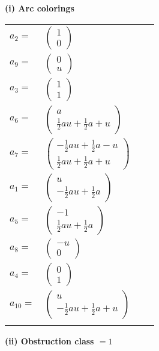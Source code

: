 \documentclass[1p]{elsarticle_modified}
\theoremstyle{definition}
\begin{document}
\flushleft \textbf{(i) Arc colorings}\\
\begin{tabular}{m{7pt} m{180pt} m{7pt} m{180pt} }
\flushright $a_{2}=$&$\begin{pmatrix}1\\0\end{pmatrix}$ \\
\flushright $a_{9}=$&$\begin{pmatrix}0\\u\end{pmatrix}$ \\
\flushright $a_{3}=$&$\begin{pmatrix}1\\1\end{pmatrix}$ \\
\flushright $a_{6}=$&$\begin{pmatrix}a\\\frac{1}{2} a u+\frac{1}{2} a+u\end{pmatrix}$ \\
\flushright $a_{7}=$&$\begin{pmatrix}-\frac{1}{2} a u+\frac{1}{2} a- u\\\frac{1}{2} a u+\frac{1}{2} a+u\end{pmatrix}$ \\
\flushright $a_{1}=$&$\begin{pmatrix}u\\-\frac{1}{2} a u+\frac{1}{2} a\end{pmatrix}$ \\
\flushright $a_{5}=$&$\begin{pmatrix}-1\\\frac{1}{2} a u+\frac{1}{2} a\end{pmatrix}$ \\
\flushright $a_{8}=$&$\begin{pmatrix}- u\\0\end{pmatrix}$ \\
\flushright $a_{4}=$&$\begin{pmatrix}0\\1\end{pmatrix}$ \\
\flushright $a_{10}=$&$\begin{pmatrix}u\\-\frac{1}{2} a u+\frac{1}{2} a+u\end{pmatrix}$\\&\end{tabular}
\flushleft \textbf{(ii) Obstruction class $= 1$}\\~\\
\end{document}
